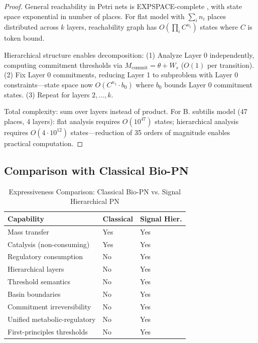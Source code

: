 \documentclass[10pt,letterpaper]{article}
\begin{document}
\begin{proof}
General reachability in Petri nets is EXPSPACE-complete \cite{esparza1996}, with state space exponential in number of places. For flat model with $\sum_i n_i$ places distributed across $k$ layers, reachability graph has $O(\prod_i C^{n_i})$ states where $C$ is token bound.

Hierarchical structure enables decomposition: (1) Analyze Layer 0 independently, computing commitment thresholds via $M_{\text{commit}} = \theta + W_s$ ($O(1)$ per transition). (2) Fix Layer 0 commitments, reducing Layer 1 to subproblem with Layer 0 constraints---state space now $O(C^{n_1} \cdot b_0)$ where $b_0$ bounds Layer 0 commitment states. (3) Repeat for layers $2, \ldots, k$.

Total complexity: sum over layers instead of product. For B. subtilis model (47 places, 4 layers): flat analysis requires $O(10^{47})$ states; hierarchical analysis requires $O(4 \cdot 10^{12})$ states---reduction of 35 orders of magnitude enables practical computation.
\end{proof}

\subsection{Comparison with Classical Bio-PN}

\begin{table}[h]
\centering
\small
\caption{Expressiveness Comparison: Classical Bio-PN vs. Signal Hierarchical PN}
\begin{tabular}{p{5cm}p{2.5cm}p{2.5cm}}
\toprule
\textbf{Capability} & \textbf{Classical} & \textbf{Signal Hier.} \\
\midrule
Mass transfer & Yes & Yes \\
Catalysis (non-consuming) & Yes & Yes \\
Regulatory consumption & No & Yes \\
Hierarchical layers & No & Yes \\
Threshold semantics & No & Yes \\
Basin boundaries & No & Yes \\
Commitment irreversibility & No & Yes \\
Unified metabolic-regulatory & No & Yes \\
First-principles thresholds & No & Yes \\
\bottomrule
\end{tabular}
\end{table}
\end{document}
